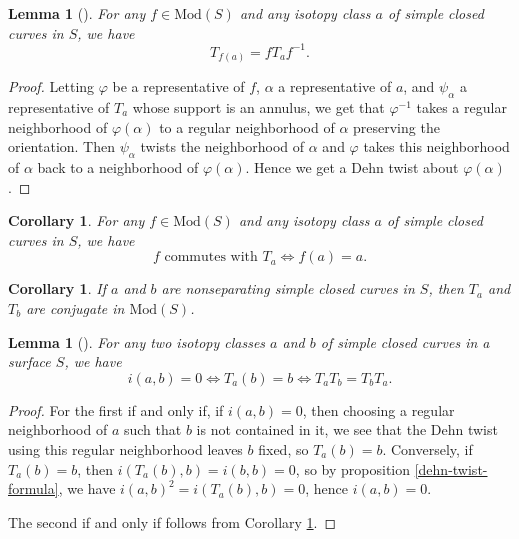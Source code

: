\documentclass[reqno]{amsart}
\newtheorem{lemma}[theorem]{Lemma}
\newtheorem{corollary}[theorem]{Corollary}
\theoremstyle{definition}
\theoremstyle{remark}
\newcommand{\Mod}{{\mathrm{Mod}}}
\begin{document}
\begin{lemma}[]
    For any $f \in \Mod(S)$ and any isotopy class $a$ of
    simple closed curves in $S$, we have
    \[
    T_{f(a)} = f T_a f^{-1}.
    \] 
\end{lemma}

\begin{proof}
    Letting $\varphi $ be a representative of $f$,
    $\alpha$ a representative of $a$, and
    $\psi_{\alpha}$ a representative of
    $T_a$ whose support is an annulus, we get that
    $\varphi^{-1}$ takes a regular neighborhood
    of $\varphi \left( \alpha \right) $ to a regular neighborhood
    of $\alpha$ preserving the orientation. Then
    $\psi_{\alpha}$ twists the neighborhood of $\alpha$ and
    $\varphi $ takes this neighborhood of $\alpha$ back to
    a neighborhood of $\varphi \left( \alpha \right) $.
    Hence we get a Dehn twist about $\varphi \left( \alpha \right) $.
\end{proof}


\begin{corollary}\label{dehn-commute}
    For any $f \in \Mod(S)$ and any isotopy class $a$ of simple
    closed curves in $S$, we have
    \[
    f \text{ commutes with }T_a \iff
    f(a) = a.
    \] 
\end{corollary}

\begin{corollary}
    If $a$ and $b$ are nonseparating simple closed curves
    in $S$, then $T_a$ and $T_b$ are conjugate in
    $\Mod(S)$.
\end{corollary}

\begin{lemma}[]\label{dehn-intersection-0}
    For any two isotopy classes $a$ and $b$ of simple
    closed curves in a surface $S$, we have
    \[
    i(a,b) = 0 \iff T_a(b) = b \iff
    T_a T_b = T_b T_a.
    \] 
\end{lemma}

\begin{proof}
    For the first if and only if, if $i(a,b) = 0$, then
    choosing a regular neighborhood of $a$ such that
    $b$ is not contained in it, we see that the
    Dehn twist using this regular neighborhood leaves
    $b$ fixed, so $T_a (b) = b$. Conversely, if
    $T_a (b) = b$, then 
    $i \left( T_a(b), b \right) = i(b,b) = 0$, so
    by proposition \ref{dehn-twist-formula}, we have
    $i\left( a,b \right)^2 = 
    i \left( T_a(b), b \right) = 0$, hence
    $i (a,b) = 0$.

    The second if and only if follows from
    Corollary \ref{dehn-commute}.
\end{proof}
\end{document}
